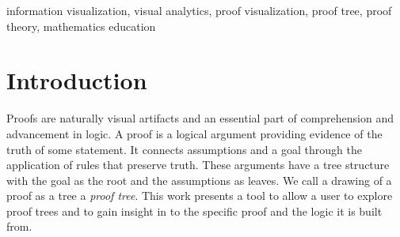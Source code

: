 \documentclass[conference]{IEEEtran}
\begin{document}
\newcommand{\sentencefive}{The proof visualization tool allows either open exploration of a proof or a directed walk-through, revealing supplementary information to serve as a form of discourse as the nodes are visited.}


\newcommand{\sentencesix}{This work provides a tool for gaining understanding of the structure of proofs, insight into the processes used in constructing such proofs, and also serves as a starting point for visualizations of proof trees in more complicated logics.}




\begin{abstract}
    \sentenceone{} \sentencetwo{} \sentencethree{} \sentencefour{} \sentencefive{} \sentencesix{}
\end{abstract}


\begin{IEEEkeywords}
    information visualization, visual analytics, proof visualization, proof tree, proof theory, mathematics education
\end{IEEEkeywords}


\section{Introduction}
\label{sec:intro}


Proofs are naturally visual artifacts and an essential part of comprehension and advancement in logic. A proof is a logical argument providing evidence of the truth of some statement. It connects assumptions and a goal through the application of rules that preserve truth. These arguments have a tree structure with the goal as the root and the assumptions as leaves. We call a drawing of a proof as a tree a \textit{proof tree}. This work presents a tool to allow a user to explore proof trees and to gain insight in to the specific proof and the logic it is built from.
\end{document}
